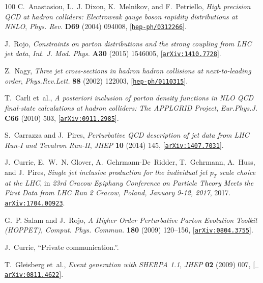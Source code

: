 \begin{thebibliography}{100}
C.~Anastasiou, L.~J. Dixon, K.~Melnikov, and F.~Petriello, {\it {High precision
  QCD at hadron colliders: Electroweak gauge boson rapidity distributions at
  NNLO}},  {\em Phys. Rev.} {\bf D69} (2004) 094008,
  [\href{http://arxiv.org/abs/hep-ph/0312266}{{\tt hep-ph/0312266}}].

J.~Rojo, {\it {Constraints on parton distributions and the strong coupling from
  LHC jet data}},  {\em Int. J. Mod. Phys.} {\bf A30} (2015) 1546005,
  [\href{http://arxiv.org/abs/1410.7728}{{\tt arXiv:1410.7728}}].

Z.~Nagy, {\it {Three jet cross-sections in hadron hadron collisions at
  next-to-leading order}},  {\em Phys.Rev.Lett.} {\bf 88} (2002) 122003,
  [\href{http://arxiv.org/abs/hep-ph/0110315}{{\tt hep-ph/0110315}}].

T.~Carli et~al., {\it {A posteriori inclusion of parton density functions in
  NLO QCD final-state calculations at hadron colliders: The APPLGRID Project}},
   {\em Eur.Phys.J.} {\bf C66} (2010) 503,
  [\href{http://arxiv.org/abs/0911.2985}{{\tt arXiv:0911.2985}}].

S.~Carrazza and J.~Pires, {\it {Perturbative QCD description of jet data from
  LHC Run-I and Tevatron Run-II}},  {\em JHEP} {\bf 10} (2014) 145,
  [\href{http://arxiv.org/abs/1407.7031}{{\tt arXiv:1407.7031}}].

J.~Currie, E.~W.~N. Glover, A.~Gehrmann-De~Ridder, T.~Gehrmann, A.~Huss, and
  J.~Pires, {\it {Single jet inclusive production for the individual jet
  $p_{T}$ scale choice at the LHC}},  in {\em {23rd Cracow Epiphany Conference
  on Particle Theory Meets the First Data from LHC Run 2 Cracow, Poland,
  January 9-12, 2017}}, 2017.
\newblock \href{http://arxiv.org/abs/1704.00923}{{\tt arXiv:1704.00923}}.

G.~P. Salam and J.~Rojo, {\it {A Higher Order Perturbative Parton Evolution
  Toolkit (HOPPET)}},  {\em Comput. Phys. Commun.} {\bf 180} (2009) 120--156,
  [\href{http://arxiv.org/abs/0804.3755}{{\tt arXiv:0804.3755}}].

J.~Currie, ``{Private communication}.''.

T.~Gleisberg et~al., {\it {Event generation with SHERPA 1.1}},  {\em JHEP} {\bf
  02} (2009) 007, [\href{http://arxiv.org/abs/0811.4622}{{\tt
  arXiv:0811.4622}}].


\end{thebibliography}
